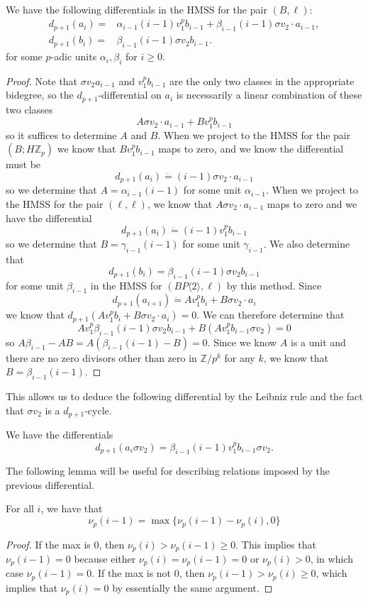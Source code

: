 \begin{prop}
	We have the following differentials in the HMSS for the pair $(B,\ell)$:
	\begin{align*}
	d_{p+1}(a_i) = & \alpha_{i-1}(i-1)v_1^{p} b_{i-1} +\beta_{i-1}(i-1)\sigma v_2 \cdot a_{i-1}, \\
	d_{p+1}(b_i) =& \beta_{i-1}(i-1)\sigma v_2 b_{i-1}.
	\end{align*}
	for some $p$-adic units $\alpha_i,\beta_i$ for $i\ge 0$. 
\end{prop}
\begin{proof}
	Note that $\sigma v_2 a_{i-1}$ and $v_1^p b_{i-1}$ are the only two classes in the appropriate bidegree, so the $d_{p+1}$-differential on $a_i$ is necessarily a linear combination of these two classes 
	\[ A\sigma v_2 \cdot a_{i-1} + B  v_1^{p} b_{i-1}\]
	so it suffices to determine $A$ and $B$.
	When we project to the HMSS for the pair $(B;H\mathbb{Z}_p)$ we know that $Bv_1^pb_{i-1}$ maps to zero, and we know the differential must be
	\[ d_{p+1}(a_i) \dot{=}(i-1)\sigma v_2 \cdot a_{i-1} \]
	so we determine that $A=\alpha_{i-1}(i-1)$ for some unit $\alpha_{i-1}$. When we project to the HMSS for the pair $(\ell,\ell)$, we know that $A\sigma v_2 \cdot a_{i-1}$ maps to zero and we have the differential 
	\[ d_{p+1}(a_i)\dot{=} (i-1)v_1^{p} b_{i-1}\]
	so we determine that $B=\gamma_{i-1}(i-1)$ for some unit $\gamma_{i-1}$. We also determine that 
	\[ d_{p+1}(b_i)= \beta_{i-1}(i-1)\sigma v_2 b_{i-1}\] 
	for some unit $\beta_{i-1}$ in the HMSS for $(BP\langle 2 \rangle ,\ell)$ by this method. Since 
	\[ d_{p+1}(a_{i+1}) \dot{=} Av_1^{p} b_{i} +B\sigma v_2 \cdot a_{i} \]
	we know that $d_{p+1}(Av_1^{p} b_{i} +B\sigma v_2 \cdot a_{i} )=0$. We can therefore determine that 
	\[Av_1^{p}\beta_{i-1}(i-1)\sigma v_2 b_{i-1}+ B(Av_1^{p} b_{i-1}\sigma v_2)=0\]
	so $A\beta_{i-1}-AB=A(\beta_{i-1}(i-1)-B)=0$. Since we know $A$ is a unit and there are no zero divisors other than zero in $\mathbb{Z}/p^k$ for any $k$, we know that $B=\beta_{i-1}(i-1)$. 
\end{proof}

This allows us to deduce the following differential by the Leibniz rule and the fact that $\sigma v_2$ is a $d_{p+1}$-cycle.

\begin{cor}
	We have the differentials
	\[
	d_{p+1}( a_{i} \sigma v_2) = \beta_{i-1}(i-1)v_1^pb_{i-1}\sigma v_2.
	\]
\end{cor}

The  following lemma will be useful for describing relations imposed by the previous differential.
\begin{lem}
	For all $i$, we have that 
	\[
	\nu_p(i-1) = \max\{\nu_p(i-1)-\nu_p(i), 0\}
	\]
\end{lem}
\begin{proof}
	If the max is 0, then $\nu_p(i)>\nu_{p}(i-1)\geq 0$. This implies that $\nu_p(i-1)=0$ because either $\nu_p(i)=\nu_p(i-1)=0$ or $\nu_p(i)>0$, in which case $\nu_p(i-1)=0$. If the max is not 0, then $\nu_p(i-1)>\nu_p(i)\geq 0$, which implies that $\nu_p(i)=0$ by essentially the same argument.
\end{proof}

